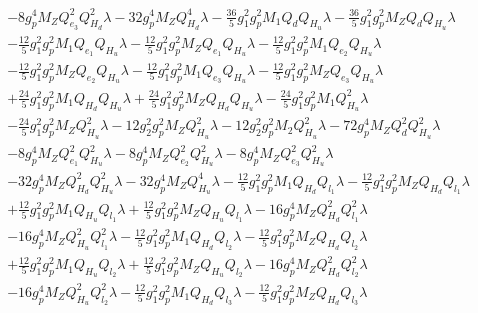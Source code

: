 \begin{align}
 &-8 g_{p}^{4} M_Z Q_{e_3}^{2} Q_{H_d}^{2} \lambda -32 g_{p}^{4} M_Z Q_{H_d}^{4} \lambda -\frac{36}{5} g_{1}^{2} g_{p}^{2} M_1 Q_{d} Q_{H_u} \lambda -\frac{36}{5} g_{1}^{2} g_{p}^{2} M_Z Q_{d} Q_{H_u} \lambda \nonumber \\ 
 &-\frac{12}{5} g_{1}^{2} g_{p}^{2} M_1 Q_{e_{1}} Q_{H_u} \lambda -\frac{12}{5} g_{1}^{2} g_{p}^{2} M_Z Q_{e_{1}} Q_{H_u} \lambda -\frac{12}{5} g_{1}^{2} g_{p}^{2} M_1 Q_{e_{2}} Q_{H_u} \lambda \nonumber \\ 
 &-\frac{12}{5} g_{1}^{2} g_{p}^{2} M_Z Q_{e_{2}} Q_{H_u} \lambda -\frac{12}{5} g_{1}^{2} g_{p}^{2} M_1 Q_{e_3} Q_{H_u} \lambda -\frac{12}{5} g_{1}^{2} g_{p}^{2} M_Z Q_{e_3} Q_{H_u} \lambda \nonumber \\ 
 &+\frac{24}{5} g_{1}^{2} g_{p}^{2} M_1 Q_{H_d} Q_{H_u} \lambda +\frac{24}{5} g_{1}^{2} g_{p}^{2} M_Z Q_{H_d} Q_{H_u} \lambda -\frac{24}{5} g_{1}^{2} g_{p}^{2} M_1 Q_{H_u}^{2} \lambda \nonumber \\ 
 &-\frac{24}{5} g_{1}^{2} g_{p}^{2} M_Z Q_{H_u}^{2} \lambda -12 g_{2}^{2} g_{p}^{2} M_Z Q_{H_u}^{2} \lambda -12 g_{2}^{2} g_{p}^{2} M_2 Q_{H_u}^{2} \lambda -72 g_{p}^{4} M_Z Q_{d}^{2} Q_{H_u}^{2} \lambda \nonumber \\ 
 &-8 g_{p}^{4} M_Z Q_{e_{1}}^{2} Q_{H_u}^{2} \lambda -8 g_{p}^{4} M_Z Q_{e_{2}}^{2} Q_{H_u}^{2} \lambda -8 g_{p}^{4} M_Z Q_{e_3}^{2} Q_{H_u}^{2} \lambda \nonumber \\ 
 &-32 g_{p}^{4} M_Z Q_{H_d}^{2} Q_{H_u}^{2} \lambda -32 g_{p}^{4} M_Z Q_{H_u}^{4} \lambda -\frac{12}{5} g_{1}^{2} g_{p}^{2} M_1 Q_{H_d} Q_{l_1} \lambda -\frac{12}{5} g_{1}^{2} g_{p}^{2} M_Z Q_{H_d} Q_{l_1} \lambda \nonumber \\ 
 &+\frac{12}{5} g_{1}^{2} g_{p}^{2} M_1 Q_{H_u} Q_{l_1} \lambda +\frac{12}{5} g_{1}^{2} g_{p}^{2} M_Z Q_{H_u} Q_{l_1} \lambda -16 g_{p}^{4} M_Z Q_{H_d}^{2} Q_{l_1}^{2} \lambda \nonumber \\ 
 &-16 g_{p}^{4} M_Z Q_{H_u}^{2} Q_{l_1}^{2} \lambda -\frac{12}{5} g_{1}^{2} g_{p}^{2} M_1 Q_{H_d} Q_{l_2} \lambda -\frac{12}{5} g_{1}^{2} g_{p}^{2} M_Z Q_{H_d} Q_{l_2} \lambda \nonumber \\ 
 &+\frac{12}{5} g_{1}^{2} g_{p}^{2} M_1 Q_{H_u} Q_{l_2} \lambda +\frac{12}{5} g_{1}^{2} g_{p}^{2} M_Z Q_{H_u} Q_{l_2} \lambda -16 g_{p}^{4} M_Z Q_{H_d}^{2} Q_{l_2}^{2} \lambda \nonumber \\ 
 &-16 g_{p}^{4} M_Z Q_{H_u}^{2} Q_{l_2}^{2} \lambda -\frac{12}{5} g_{1}^{2} g_{p}^{2} M_1 Q_{H_d} Q_{l_3} \lambda -\frac{12}{5} g_{1}^{2} g_{p}^{2} M_Z Q_{H_d} Q_{l_3} \lambda \nonumber \\ 

\end{align}
